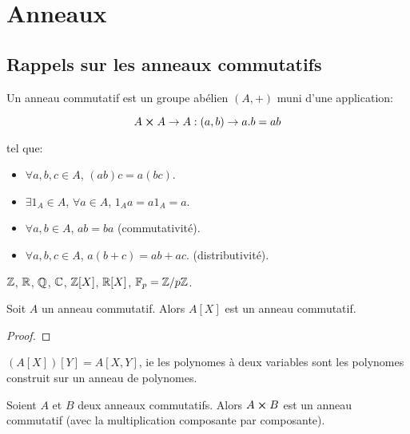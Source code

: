 \chapter{Anneaux}

\section{Rappels sur les anneaux commutatifs}

\begin{definition}
	Un anneau commutatif est un groupe abélien $(A, +)$ muni d'une application:

	\begin{equation*}
		A \cross A \rightarrow A : (a, b) \rightarrow a.b = ab
	\end{equation*}

	tel que:

	\begin{itemize}
		\item $\forall a, b, c \in A$, $(ab)c = a(bc)$.
		\item $\exists 1_{A} \in A$, $\forall a \in A$, $1_{A} a = a 1_{A} = a$.
		\item $\forall a, b \in A$, $ab = ba$ (commutativité).
		\item $\forall a, b, c \in A$, $a(b + c) = ab + ac$. (distributivité).
	\end{itemize}
\end{definition}

\begin{exemple}
	$\mathbb{Z}$, $\mathbb{R}$, $\mathbb{Q}$, $\mathbb{C}$, $\mathbb{Z}[X]$, $\mathbb{R}[X]$,
	$\mathbb{F}_{p} = \mathbb{Z}/p\mathbb{Z}$.
\end{exemple}

\begin{proposition}
	Soit $A$ un anneau commutatif. Alors $A[X]$ est un anneau commutatif.
\end{proposition}

\ifdefined\outputproof
\begin{proof}

\end{proof}
\fi

\begin{remarque}
	$(A[X])[Y] = A[X, Y]$, ie les polynomes à deux variables sont les polynomes
	construit sur un anneau de polynomes.
\end{remarque}

\begin{proposition}
	Soient $A$ et $B$ deux anneaux commutatifs. Alors $A \cross B$ est un
	anneau commutatif (avec la multiplication composante par composante).
\end{proposition}

